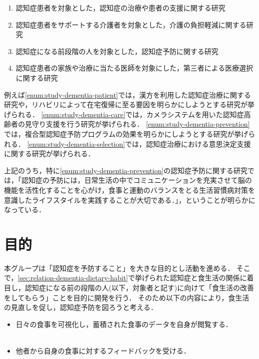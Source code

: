 \documentclass[../report]{subfiles}
\begin{document}
\begin{enumerate}
    \item \label{enum:study-dementia-patient} 認知症患者を対象とした，認知症の治療や患者の支援に関する研究
    \item \label{enum:study-dementia-care} 認知症患者をサポートする介護者を対象とした，介護の負担軽減に関する研究
    \item \label{enum:study-dementia-prevention} 認知症になる前段階の人を対象とした，認知症予防に関する研究
    \item \label{enum:study-dementia-selection} 認知症患者の家族や治療に当たる医師を対象にした，第三者による医療選択に関する研究
\end{enumerate}

例えば\ref{enum:study-dementia-patient}では，漢方を利用した認知症治療に関する研究\cite{dementia-prevention-with-chinese-medicine}や，リハビリによって在宅復帰に至る要因を明らかにしようとする研究\cite{rehabilitation}が挙げられる．
\ref{enum:study-dementia-care}では，カメラシステムを用いた認知症高齢者の見守り支援を行う研究\cite{camera-system}が挙げられる．
\ref{enum:study-dementia-prevention}では，複合型認知症予防プログラムの効果を明らかにしようとする研究\cite{dementia-prevention-with-some-programs}が挙げられる．
\ref{enum:study-dementia-selection}では，認知症治療における意思決定支援に関する研究\cite{medical-choice}が挙げられる．

上記のうち，特に\ref{enum:study-dementia-prevention}の認知症予防に関する研究では，「認知症の予防には，日常生活の中でコミュニケーションを充実させて脳の機能を活性化することを心がけ，食事と運動のバランスをとる生活習慣病対策を意識したライフスタイルを実践することが大切である．」\cite{dementia-prevention}，ということが明らかになっている．


\section{目的} \label{sec:objective}
本グループは「認知症を予防すること」を大きな目的とし活動を進める．
そこで，\ref{sec:relation-dementia-dietary-habit}で挙げられた認知症と食生活の関係に着目し，認知症になる前の段階の人(以下，対象者と記す)に向けて「食生活の改善をしてもらう」ことを目的に開発を行う．
そのため以下の内容により，食生活の見直しを促し，認知症予防を図ろうと考える．

\begin{itemize}
　　　　\item 日々の食事を可視化し，蓄積された食事のデータを自身が閲覧する．
　　　　\item 他者から自身の食事に対するフィードバックを受ける．
\end{itemize}
\end{document}
